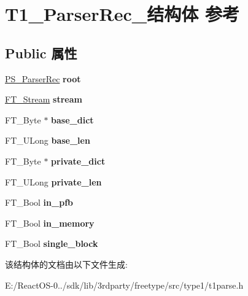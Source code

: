 \hypertarget{struct_t1___parser_rec__}{}\section{T1\+\_\+\+Parser\+Rec\+\_\+结构体 参考}
\label{struct_t1___parser_rec__}
\subsection*{Public 属性}
\begin{DoxyCompactItemize}
\item 
\mbox{\label{struct_t1___parser_rec___af260980fecd0f110bf1131c4b0e4f00c}} 
\hyperlink{struct_p_s___parser_rec__}{P\+S\+\_\+\+Parser\+Rec} {\bfseries root}
\item 
\mbox{\label{struct_t1___parser_rec___a0ae89ba7e9d61d51dbf8db87cd01ab2e}} 
\hyperlink{struct_f_t___stream_rec__}{F\+T\+\_\+\+Stream} {\bfseries stream}
\item 
\mbox{\label{struct_t1___parser_rec___ae62c48cfc0aeb66efaeed7454d677beb}} 
F\+T\+\_\+\+Byte $\ast$ {\bfseries base\+\_\+dict}
\item 
\mbox{\label{struct_t1___parser_rec___a9e005e26706ee69ea5a9cc4da8bd6527}} 
F\+T\+\_\+\+U\+Long {\bfseries base\+\_\+len}
\item 
\mbox{\label{struct_t1___parser_rec___aa48177c354c605407fff399d50767e8e}} 
F\+T\+\_\+\+Byte $\ast$ {\bfseries private\+\_\+dict}
\item 
\mbox{\label{struct_t1___parser_rec___a5695b2bee12b7a7f60dda3766db046b3}} 
F\+T\+\_\+\+U\+Long {\bfseries private\+\_\+len}
\item 
\mbox{\label{struct_t1___parser_rec___ab3a69a74c4cf9a2078fbda8811063ebf}} 
F\+T\+\_\+\+Bool {\bfseries in\+\_\+pfb}
\item 
\mbox{\label{struct_t1___parser_rec___a4aeb6bd91fbf62e5963e71e930859812}} 
F\+T\+\_\+\+Bool {\bfseries in\+\_\+memory}
\item 
\mbox{\label{struct_t1___parser_rec___a6a5ce5195db0d543a213211b69f820b2}} 
F\+T\+\_\+\+Bool {\bfseries single\+\_\+block}
\end{DoxyCompactItemize}


该结构体的文档由以下文件生成\+:\begin{DoxyCompactItemize}
\item 
E\+:/\+React\+O\+S-\/0../sdk/lib/3rdparty/freetype/src/type1/t1parse.\+h\end{DoxyCompactItemize}
